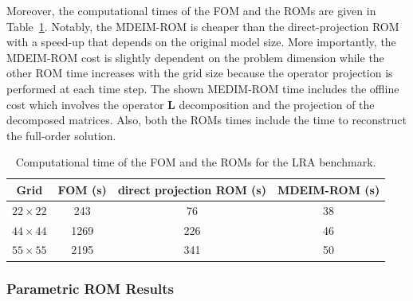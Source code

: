 \documentclass[review,number,sort&compress,12pt]{elsarticle}
\begin{document}
Moreover, the computational times of the FOM and the ROMs are given in Table~\ref{table:cpu time}.
Notably, the MDEIM-ROM is cheaper than the direct-projection ROM with a speed-up that depends on the original model size.
More importantly, the MDEIM-ROM cost is slightly dependent on the problem dimension while the other ROM time increases with the grid size because the operator projection is performed at each time step.
The shown MEDIM-ROM time includes the offline cost which involves the operator $\mathbf{L}$ decomposition and the projection of the decomposed matrices.
Also, both the ROMs times include the time to reconstruct the full-order solution.
\begin{table}[h!]
	\centering
	\caption{Computational time of the FOM and the ROMs for the LRA benchmark.}
	\label{table:cpu time}
	\begin{tabular}{c|c|c|c}  
		Grid &	FOM (s)   &  direct projection ROM (s) & MDEIM-ROM (s)    \\
		\hline
		$22\times 22$ &  243   & 76   & 38   \\
		$44\times 44$ &  1269  & 226   & 46   \\
		$55\times 55$ &  2195  & 341   & 50   \\
		\hline
	\end{tabular}
\end{table}

\subsubsection{Parametric ROM Results}
\end{document}
